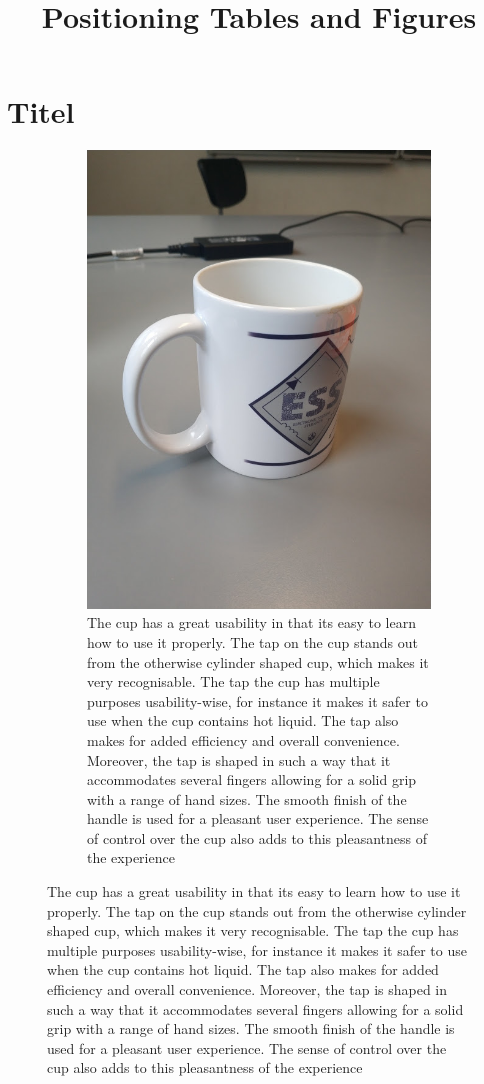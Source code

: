 \documentclass[11pt]{article}
\title{Positioning Tables and Figures}
\author{ }
\date{ }
\begin{document}
\section{Titel}

\begin{figure}[h]
    \begin{subfigure}[t]{0.5\textwidth}
        \includegraphics[scale=0.4]{InteraktionsDesign/Assets/kop.jpg}
        \caption{The cup has a great usability in that its easy to learn how to use it properly. The tap on the cup stands out from the otherwise cylinder shaped cup, which makes it very recognisable. The tap the cup has multiple purposes usability-wise, for instance it makes it safer to use when the cup contains hot liquid. The tap also makes for added efficiency and overall convenience.
        Moreover, the tap is shaped in such a way that it accommodates several fingers allowing for a solid grip with a range of hand sizes. The smooth finish of the handle is used for a pleasant user experience. The sense of control over the cup also adds to this pleasantness of the experience}

\end{subfigure}
\end{figure}
\end{document}
